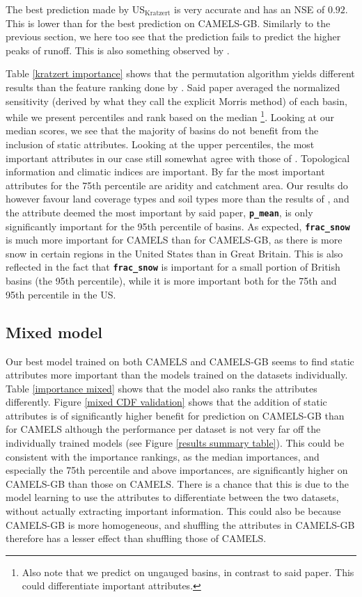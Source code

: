 The best prediction made by US$_\text{Kratzert}$ is very accurate and has an NSE of $0.92$. 
This is lower than for the best prediction on CAMELS-GB. Similarly to the previous 
section, we here too
see that the prediction fails to predict the higher peaks of runoff. 
This is also something observed by \citet{lstm_first_paper}.

Table \ref{kratzert importance} shows that the permutation algorithm yields different 
results than the feature ranking done by \citet{lstm_second_paper}. Said paper 
averaged the normalized sensitivity (derived by what they call the explicit Morris 
method) of each basin, while we present percentiles and rank based on the median
\footnote{Also note that we predict on ungauged basins, in contrast to said paper. 
This could differentiate important attributes.}. 
Looking at our median scores, we see that the majority of basins do not benefit 
from the inclusion of static attributes. Looking at the upper percentiles, the 
most important attributes in our case still somewhat agree with those of 
\citet{lstm_second_paper}. Topological information and climatic indices are important. 
By far the most important attributes for the 75th percentile are aridity and 
catchment area. Our results do however favour land coverage types and soil types 
more than the results of \citet{lstm_second_paper}, and the attribute deemed the most important by 
said paper, \textbf{\texttt{p\_mean}}, is only significantly important 
for the 95th percentile of basins. As expected, \textbf{\texttt{frac\_snow}} is 
much more important for CAMELS than for CAMELS-GB, as there is more snow 
in certain regions in the United States than in Great Britain. This is also reflected in the fact that 
\textbf{\texttt{frac\_snow}} is important for a small portion of British basins (the 95th percentile), 
while it is more important both for the 75th and 95th percentile in the US. 

\subsection{Mixed model}
Our best model trained on both CAMELS and CAMELS-GB seems to find static attributes
more important 
than the models trained on the datasets individually. Table \ref{importance mixed} 
shows that the model also ranks the attributes differently. Figure \ref{mixed CDF validation} 
shows that the addition of static attributes is of significantly higher benefit for 
prediction on CAMELS-GB than for CAMELS although the performance per dataset is not 
very far off the individually trained models (see Figure \ref{results summary table}).
This could be consistent with the importance rankings, as 
the median importances, and especially the 75th percentile and above importances, are 
significantly higher on CAMELS-GB than those on CAMELS. There is a chance that this 
is due to the model learning to use the attributes to differentiate between the 
two datasets, without actually extracting important information.
This could also be because CAMELS-GB is more homogeneous, and shuffling the 
attributes in CAMELS-GB therefore has a lesser effect than shuffling those of 
CAMELS.

